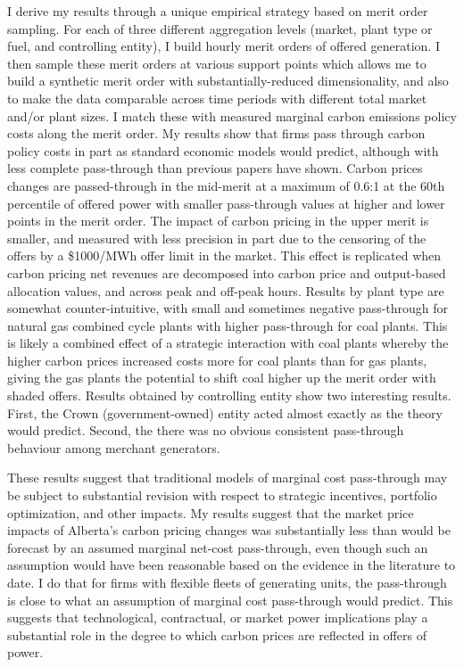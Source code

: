 \documentclass[12pt]{article}
\begin{document}
I derive my results through a unique empirical strategy based on merit order sampling. For each of three different aggregation levels (market, plant type or fuel, and controlling entity), I build hourly merit orders of offered generation. I then sample these merit orders at various support points which allows me to build a synthetic merit order with substantially-reduced dimensionality, and also to make the data comparable across time periods with different total market and/or plant sizes. I match these with measured marginal carbon emissions policy costs along the merit order. My results show that firms pass through carbon policy costs in part as standard economic models would predict, although with less complete pass-through than previous papers have shown. Carbon prices changes are passed-through in the mid-merit at a maximum of 0.6:1 at the 60th percentile of offered power with smaller pass-through values at higher and lower points in the merit order. The impact of carbon pricing in the upper merit is smaller, and measured with less precision in part due to the censoring of the offers by a \$1000/MWh offer limit in the market. This effect is replicated when carbon pricing net revenues are decomposed into carbon price and output-based allocation values, and across peak and off-peak hours. Results by plant type are somewhat counter-intuitive, with small and sometimes negative pass-through for natural gas combined cycle plants with higher pass-through for coal plants. This is likely a combined effect of a strategic interaction with coal plants whereby the higher carbon prices increased costs more for coal plants than for gas plants, giving the gas plants the potential to shift coal higher up the merit order with shaded offers. Results obtained by controlling entity show two interesting results. First, the Crown (government-owned) entity acted almost exactly as the theory would predict. Second, the there was no obvious consistent pass-through behaviour among merchant generators.

These results suggest that traditional models of marginal cost pass-through may be subject to substantial revision with respect to strategic incentives, portfolio optimization, and other impacts. My results suggest that the market price impacts of Alberta's carbon pricing changes was substantially less than would be forecast by an assumed marginal net-cost pass-through, even though such an assumption would have been reasonable based on the evidence in the literature to date. I do that for firms with flexible fleets of generating units, the pass-through is close to what an assumption of marginal cost pass-through would predict. This suggests that technological, contractual, or market power implications play a substantial role in the degree to which carbon prices are reflected in offers of power.
\end{document}
